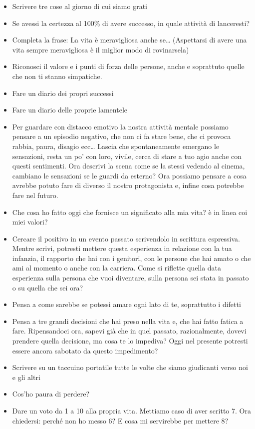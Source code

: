 \documentclass[12pt]{book} %
\begin{document}
\begin{itemize}
\item Scrivere tre cose al giorno di cui siamo grati
\item Se avessi la certezza al 100\% di avere successo, in quale attività di lanceresti?
\item Completa la frase: La vita è meravigliosa anche se… (Aspettarsi di avere una vita sempre meravigliosa è il miglior modo di rovinarsela)
\item Riconosci il valore e i punti di forza delle persone, anche e soprattuto quelle che non ti stanno simpatiche. 
\item Fare un diario dei propri successi 
\item Fare un diario delle proprie lamentele 
\item Per guardare con distacco emotivo la nostra attività mentale possiamo pensare a un episodio negativo, che non ci fa stare bene, che ci provoca rabbia, paura, disagio ecc… Lascia che spontaneamente emergano le sensazioni, resta un po' con loro, vivile, cerca di stare a tuo agio anche con questi sentimenti. Ora descrivi la scena come se la stessi vedendo al cinema, cambiano le sensazioni se le guardi da esterno? Ora possiamo pensare a cosa avrebbe potuto fare di diverso il nostro protagonista e, infine cosa potrebbe fare nel futuro.
\item Che cosa ho fatto oggi che fornisce un significato alla mia vita? è in linea coi miei valori? 
\item Cercare il positivo in un evento passato scrivendolo in scrittura espressiva. Mentre scrivi, potresti mettere
questa esperienza in relazione con la tua infanzia, il rapporto che hai con i genitori, con le persone che hai amato o
che ami al momento o anche con la carriera. Come si riflette quella data esperienza sulla persona che vuoi diventare,
sulla persona sei stata in passato o su quella che sei ora?
\item Pensa a come sarebbe se potessi amare ogni lato di te, soprattutto i difetti
\item Pensa a tre grandi decisioni che hai preso nella vita e, che hai fatto fatica a fare. Ripensandoci ora, sapevi già
che in quel passato, razionalmente, dovevi prendere quella decisione, ma cosa te lo impediva? Oggi nel presente
potresti essere ancora sabotato da questo impedimento?
\item Scrivere su un taccuino portatile tutte le volte che siamo giudicanti verso noi e gli altri
\item Cos'ho paura di perdere?
\item Dare un voto da 1 a 10 alla propria vita. Mettiamo caso di aver scritto 7. Ora chiedersi: perché non ho messo 6? E
cosa mi servirebbe per mettere 8? 
\end{itemize}
\end{document}
